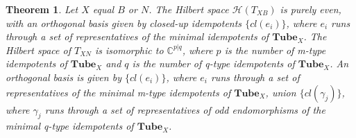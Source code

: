 \documentclass[12pt,a4paper]{article}
\newtheorem{theorem}{Theorem}[subsection]
\newcommand{\cc}{\mathbb{C}}
\newcommand{\mch}{\mathcal{H}}
\newcommand{\tube}{\textbf{Tube}}
\begin{document}
\begin{theorem} \label{torus_basis_theorem}
Let $X$ equal $B$ or $N$.
The Hilbert space $\mch(T_{XB})$ is purely even, with an orthogonal basis given by closed-up idempotents $\{cl(e_i)\}$,
where $e_i$ runs through a set of representatives of the minimal idempotents of $\tube_X$.
The Hilbert space of $T_{XN}$ is isomorphic to $\cc^{p|q}$, where $p$ is the number of m-type idempotents of $\tube_X$
and $q$ is the number of q-type idempotents of $\tube_X$.
An orthogonal basis is given by $\{cl(e_i)\}$, where $e_i$ runs through a set of 
representatives of the minimal m-type idempotents of $\tube_X$,
union $\{cl(\gamma_j)\}$,
where $\gamma_j$ runs through a set of representatives of odd endomorphisms of the minimal q-type idempotents of $\tube_X$.
\end{theorem}
\end{document}
